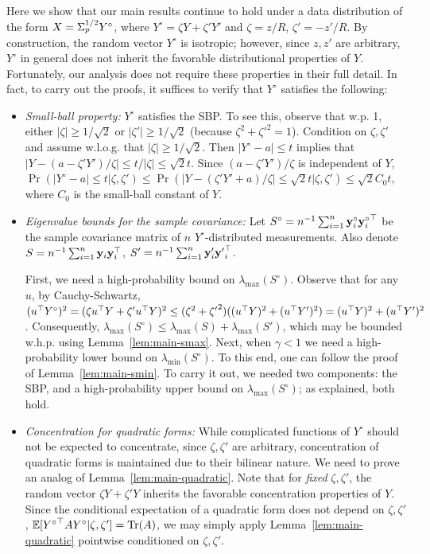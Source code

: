 \documentclass[times,sort&compress,3p]{elsarticle}
\begin{document}
Here we show that our main results continue to hold under a data distribution of the form $X=\Sigma_p^{1/2}Y^{\circ}$, where $Y^{\circ}=\zeta Y + \zeta' Y'$ and $\zeta=z/R$, $\zeta'=-z'/R$.  
By construction, the random vector $Y^{\circ}$ is isotropic; however, since $z,z'$ are arbitrary, $Y^{\circ}$ in general does not inherit the favorable distributional properties of $Y$. Fortunately, our analysis does not require these properties in their full detail. In fact, to carry out the proofs, it suffices to verify that $Y^{\circ}$ satisfies the following:

\begin{itemize}
    \item {\it Small-ball property:} $Y^{\circ}$ satisfies the SBP. To see this, observe that w.p. 1, either $|\zeta|\ge 1/\sqrt{2}$ or $|\zeta'|\ge 1/\sqrt{2}$ (because $\zeta^2+{\zeta'}^2=1$). Condition on $\zeta,\zeta'$ and  assume w.l.o.g. that $|\zeta|\ge 1/\sqrt{2}$. Then $|Y^{\circ}-a|\le t$ implies that $|Y-(a-\zeta'Y')/\zeta|\le t/|\zeta| \le \sqrt{2}t$. Since $(a-\zeta'Y')/\zeta$ is independent of $Y$, $\Pr(|Y^{\circ}-a|\le t|\zeta,\zeta') \le \Pr(|Y-(\zeta'Y'+a)/\zeta|\le  \sqrt{2}t|\zeta,\zeta')\le \sqrt{2}C_0 t$, where $C_0$ is the small-ball constant of $Y$.
    
    \item {\it Eigenvalue bounds for the sample covariance:} Let $S^{\circ}=n^{-1}\sum_{i=1}^n {\bf y}_i^{\circ}{{\bf y}_i^\circ}^\top$ be the sample covariance matrix of $n$ $Y^{\circ}$-distributed measurements. Also denote $S=n^{-1}\sum_{i=1}^n {\bf y}_i{\bf y}_i^\top$, $S'=n^{-1}\sum_{i=1}^n {\bf y}'_i{{\bf y}'}_i^\top$. 
    
    First, we need a high-probability bound on $\lambda_{\max}(S^\circ)$. Observe that for any $u$, by Cauchy-Schwartz, $(u^\top Y^{\circ})^2 = (\zeta u^\top Y + \zeta' u^\top Y)^2 \le (\zeta^2+{\zeta'}^2)( (u^\top Y)^2 + (u^\top Y')^2) = (u^\top Y)^2 + (u^\top Y')^2$. Consequently, $\lambda_{\max}(S^\circ) \le \lambda_{\max}(S) + \lambda_{\max}(S')$, which may be bounded w.h.p. using Lemma~\ref{lem:main-smax}.
    Next, when $\gamma<1$ we need a high-probability lower bound on $\lambda_{\min}(S^\circ)$. To this end, one can follow the proof of Lemma~\ref{lem:main-smin}.  To carry it out, we needed two components: the SBP, and a high-probability upper bound on $\lambda_{\max}(S^\circ)$; as explained, both hold.
    
    \item {\it Concentration for quadratic forms:}
    While complicated functions of $Y^\circ$ should not be expected to concentrate, since $\zeta,\zeta'$ are  arbitrary, concentration of quadratic forms is maintained due to their bilinear nature. 
    We need to prove an analog of Lemma~\ref{lem:main-quadratic}. Note that for \emph{fixed} $\zeta,\zeta'$, the random vector $\zeta Y + \zeta' Y$ inherits the favorable concentration properties of $Y$. Since the conditional expectation of a quadratic form does not depend on $\zeta,\zeta'$, ${\mathbb{E}}[{Y^\circ}^\top A Y^{\circ}|\zeta,\zeta']=\textrm{Tr}(A)$, we may simply apply Lemma~\ref{lem:main-quadratic} pointwise conditioned on $\zeta,\zeta'$.
    

\end{itemize}
\end{document}
